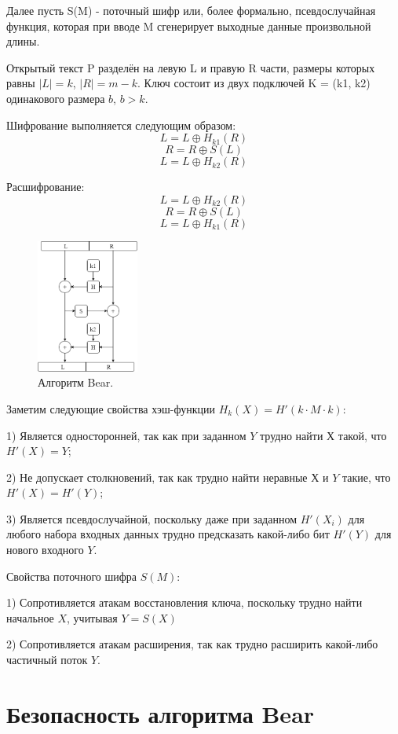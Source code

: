 \documentclass[12pt]{article}
\begin{document}
Далее пусть S(M) - поточный шифр или, более формально, псевдослучайная функция, которая при вводе M сгенерирует выходные данные произвольной длины.

Открытый текст P разделён на левую L и правую R части, размеры которых равны $|L| = k$, $|R| = m - k$. Ключ состоит из двух подключей K = (k1, k2) одинакового размера $b$, $b > k$.

Шифрование выполняется следующим образом:
\[L = L\oplus H_{k1}(R)\]
\[R = R\oplus S(L)\]
\[L = L\oplus H_{k2}(R)\]

Расшифрование:
\[L = L\oplus H_{k2}(R)\]
\[R = R\oplus S(L)\]
\[L = L\oplus H_{k1}(R)\]


\begin{figure}
\centering
\includegraphics[width=0.3\textwidth]{Bear.png}
\caption{\label{fig:Bear}Алгоритм Bear.}
\end{figure}
\vspace{5mm}
Заметим следующие свойства хэш-функции $H_{k}(X) = {H'(k\cdot M \cdot k)}$:

    1) Является односторонней, так как при заданном $Y$ трудно найти $Х$ такой, что $H'(X) = Y$;
   
    2) Не допускает столкновений, так как трудно найти неравные $Х$ и $Y$ такие, что $H'(X) = H'(Y)$;
    
    3) Является псевдослучайной, поскольку даже при заданном $H'(X_{i})$ для любого набора входных данных трудно предсказать какой-либо бит $H'(Y)$ для нового входного $Y$.
\vspace{5mm}

Свойства поточного шифра $S(M)$:

    1) Сопротивляется атакам восстановления ключа, поскольку трудно найти начальное $X$, учитывая $Y = S(X)$
    
    2) Сопротивляется атакам расширения, так как трудно расширить какой-либо частичный поток $Y$.

\section{Безопасность алгоритма Bear} 
\end{document}
